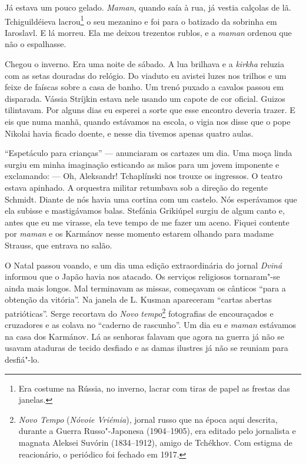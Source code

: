 Já estava um pouco gelado. \emph{Maman}, quando saía à rua, já vestia
calçolas de lã. Tchiguildéieva lacrou\footnote{Era costume na Rússia, no
  inverno, lacrar com tiras de papel as frestas das janelas.} o seu
mezanino e foi para o batizado da sobrinha em Iaroslavl. E lá morreu.
Ela me deixou trezentos rublos, e a \emph{maman} ordenou que não o
espalhasse.

Chegou o inverno. Era uma noite de sábado. A lua brilhava e a
\emph{kirkha} reluzia com as setas douradas do relógio. Do viaduto eu
avistei luzes nos trilhos e um feixe de faíscas sobre a casa de banho.
Um trenó puxado a cavalos passou em disparada. Vássia Stríjkin estava
nele usando um capote de cor oficial. Guizos tilintavam. Por alguns dias
eu esperei a sorte que esse encontro deveria trazer. E eis que numa
manhã, quando estávamos na escola, o vigia nos disse que o pope Nikolai
havia ficado doente, e nesse dia tivemos apenas quatro aulas.

``Espetáculo para crianças'' --- anunciaram os cartazes um dia. Uma moça
linda surgiu em minha imaginação esticando as mãos para um jovem
imponente e exclamando: --- Oh, Aleksandr! Tchaplínski nos trouxe os
ingressos. O teatro estava apinhado. A orquestra militar retumbava sob a
direção do regente Schmidt. Diante de nós havia uma cortina com um
castelo. Nós esperávamos que ela subisse e mastigávamos balas. Stefánia
Grikiúpel surgiu de algum canto e, antes que eu me virasse, ela teve
tempo de me fazer um aceno. Fiquei contente por \emph{maman} e os
Karmánov nesse momento estarem olhando para madame Strauss, que entrava
no salão.

O Natal passou voando, e um dia uma edição extraordinária do jornal
\emph{Dviná} informou que o Japão havia nos atacado. Os serviços
religiosos tornaram"-se ainda mais longos. Mal terminavam as missas,
começavam os cânticos ``para a obtenção da vitória''. Na janela de L.
Kusman apareceram ``cartas abertas patrióticas''. Serge recortava do
\emph{Novo} \emph{tempo}\footnote{\emph{Novo Tempo} (\emph{Nóvoie
  Vriémia}), jornal russo que na época aqui descrita, durante a Guerra
  Russo"-Japonesa (1904--1905), era editado pelo jornalista e magnata
  Aleksei Suvórin (1834--1912), amigo de Tchékhov. Com estigma de
  reacionário, o periódico foi fechado em 1917.} fotografias de
encouraçados e cruzadores e as colava no ``caderno de rascunho''. Um dia
eu e \emph{maman} estávamos na casa dos Karmánov. Lá as senhoras falavam
que agora na guerra já não se usavam ataduras de tecido desfiado e as
damas ilustres já não se reuniam para desfiá"-lo.

